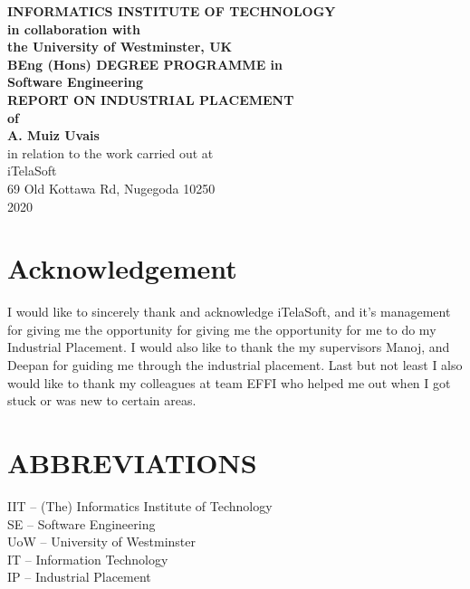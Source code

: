 \documentclass[12pt]{article}
\begin{document}
\begin{titlepage}
\begin{center}
    {\Large\bfseries INFORMATICS INSTITUTE OF TECHNOLOGY \\ in collaboration with \\
    the University of Westminster, UK\\}
\vspace{1cm}
{\Large \bfseries BEng (Hons) DEGREE PROGRAMME in \\ Software Engineering\\}
\vspace{2.5cm}
{\Large\bfseries REPORT ON INDUSTRIAL PLACEMENT \\ of \\ A. Muiz Uvais\\}
\vspace{2cm}
{\Large in relation to the work carried out at \\ iTelaSoft \\ 69 Old Kottawa Rd, Nugegoda 10250 \\ 2020\\}

\end{center}

\end{titlepage}

\section*{Acknowledgement}
I would like to sincerely thank and acknowledge iTelaSoft,
and it's management for giving me the opportunity for giving 
me the opportunity for me to do my Industrial Placement.
\newline
\newline
I would also like to thank the my supervisors
Manoj, and Deepan for guiding me through the industrial placement. \newline \newline 
Last but not least
I also would like to thank my colleagues at team EFFI who helped me out when I got stuck or was new to
certain areas.
\newpage

\tableofcontents

\listoffigures

\section*{ABBREVIATIONS}
{\large IIT -- (The) Informatics Institute of Technology\\}
\newline
{\large SE -- Software Engineering\\}
\newline
{\large UoW -- University of Westminster\\}
\newline
{\large IT -- Information Technology\\}
\newline
{\large IP -- Industrial Placement\\}
\newpage
\end{document}
